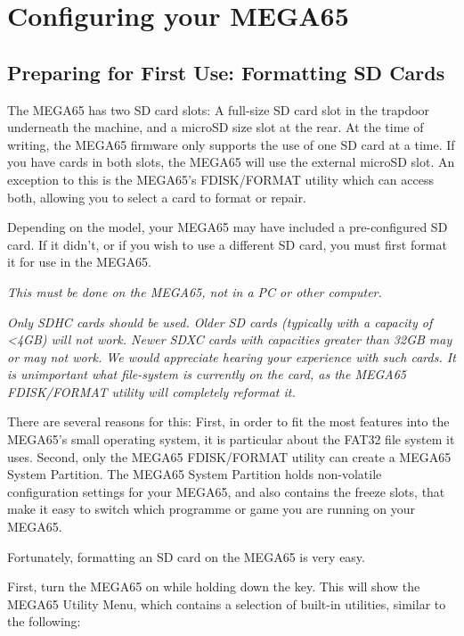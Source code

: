 \chapter{Configuring your MEGA65}
\label{cha:configuring}

\section{Preparing for First Use: Formatting SD Cards}

The MEGA65 has two SD card slots: A full-size SD card slot in the trapdoor underneath the machine,
and a microSD size slot at the rear. At the time of writing,
the MEGA65 firmware only supports the use of one SD card at a time.
If you have cards in both slots, the MEGA65 will use the external microSD
slot. An exception to this is the MEGA65's FDISK/FORMAT
utility which can access both, allowing you to select a card to format or
repair.

Depending on the model, your MEGA65 may have included a pre-configured SD card.
If it didn't, or if you wish to use a different SD card, you must first format it for use in the MEGA65.

{\em This must be done on the MEGA65, not in a PC or other computer.}

{\em Only SDHC cards should be used. Older SD cards (typically with
  a capacity of <4GB) will not work.  Newer SDXC cards with
  capacities greater than 32GB may or may not work.  We would
  appreciate hearing your experience with such cards. It is unimportant
  what file-system is currently on the card, as the MEGA65
  FDISK/FORMAT utility will completely reformat it.}

There are several reasons for this: First, in order to fit the most
features into the MEGA65's small operating system, it is
particular about the FAT32 file system it uses. Second, only the
MEGA65 FDISK/FORMAT utility can create a MEGA65 System Partition. The
MEGA65 System Partition holds non-volatile configuration settings for
your MEGA65, and also contains the freeze slots, that make it easy to
switch which programme or game you are running on your MEGA65.

Fortunately, formatting an SD card on the MEGA65 is very easy.

First, turn the MEGA65 on while holding down the  key.
This will show the MEGA65 Utility Menu, which contains a
selection of built-in utilities, similar to the following:

